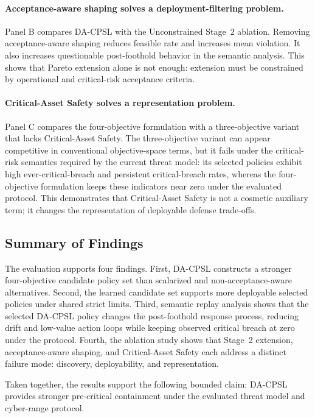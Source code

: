 \documentclass[sigconf,review,anonymous]{acmart}
\begin{document}
\paragraph{Acceptance-aware shaping solves a deployment-filtering problem.}
Panel B compares DA-CPSL with the Unconstrained Stage~2 ablation.
Removing acceptance-aware shaping reduces feasible rate and increases
mean violation. It also increases questionable post-foothold behavior in
the semantic analysis. This shows that Pareto extension alone is not
enough: extension must be constrained by operational and critical-risk
acceptance criteria.

\paragraph{Critical-Asset Safety solves a representation problem.}
Panel C compares the four-objective formulation with a three-objective
variant that lacks Critical-Asset Safety. The three-objective variant can
appear competitive in conventional objective-space terms, but it fails
under the critical-risk semantics required by the current threat model:
its selected policies exhibit high ever-critical-breach and persistent
critical-breach rates, whereas the four-objective formulation keeps these
indicators near zero under the evaluated protocol. This demonstrates that
Critical-Asset Safety is not a cosmetic auxiliary term; it changes the
representation of deployable defense trade-offs.

\subsection{Summary of Findings}
\label{subsec:results-summary}

The evaluation supports four findings. First, DA-CPSL constructs a
stronger four-objective candidate policy set than scalarized and
non-acceptance-aware alternatives. Second, the learned candidate set
supports more deployable selected policies under shared strict limits.
Third, semantic replay analysis shows that the selected DA-CPSL policy
changes the post-foothold response process, reducing drift and low-value
action loops while keeping observed critical breach at zero under the
protocol. Fourth, the ablation study shows that Stage~2 extension,
acceptance-aware shaping, and Critical-Asset Safety each address a
distinct failure mode: discovery, deployability, and representation.

Taken together, the results support the following bounded claim:
DA-CPSL provides stronger pre-critical containment under the evaluated
threat model and cyber-range protocol.
\end{document}
